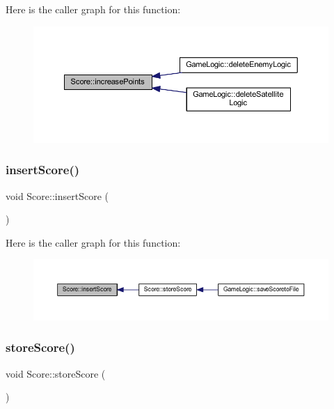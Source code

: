 Here is the caller graph for this function\+:\nopagebreak
\begin{figure}[H]
\begin{center}
\leavevmode
\includegraphics[width=350pt]{class_score_a017f4ad80df1e9d51e62789d8e5e9605_icgraph}
\end{center}
\end{figure}
\mbox{\label{class_score_ab207e77378c558c261526487aa725db9}} 
\subsubsection{\texorpdfstring{insert\+Score()}{insertScore()}}
{\footnotesize\ttfamily void Score\+::insert\+Score (\begin{DoxyParamCaption}{ }\end{DoxyParamCaption})}

Here is the caller graph for this function\+:\nopagebreak
\begin{figure}[H]
\begin{center}
\leavevmode
\includegraphics[width=350pt]{class_score_ab207e77378c558c261526487aa725db9_icgraph}
\end{center}
\end{figure}
\mbox{\label{class_score_a8cc9e62ee4d086c0f2e1b8ef6d2cbf8d}} 
\subsubsection{\texorpdfstring{store\+Score()}{storeScore()}}
{\footnotesize\ttfamily void Score\+::store\+Score (\begin{DoxyParamCaption}{ }\end{DoxyParamCaption})}



